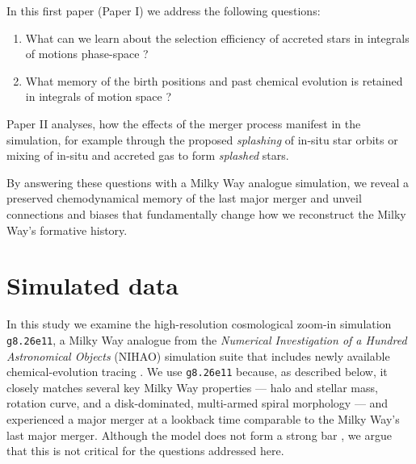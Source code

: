 \documentclass[fleqn,usenatbib]{mnras}
\begin{document}
In this first paper (Paper I) we address the following questions: 
\begin{enumerate}[leftmargin=2em,labelwidth=0em]
    \item What can we learn about the selection efficiency of accreted stars in integrals of motions phase-space \citep{Helmi2018, Feuillet2021, Buder2022, Monty2024}?
    \item What memory of the birth positions and past chemical evolution is retained in integrals of motion space \citep{Skuladottir2025}?
\end{enumerate}

Paper II analyses, how the effects of the merger process manifest in the simulation, for example through the proposed \textit{splashing} of in-situ star orbits \citep{Belokurov2020} or mixing of in-situ and accreted gas to form \textit{splashed} stars.

By answering these questions with a Milky Way analogue simulation, we reveal a preserved chemodynamical memory of the last major merger and unveil connections and biases that fundamentally change how we reconstruct the Milky Way's formative history.

\section{Simulated data} \label{sec:data}

In this study we examine the high-resolution cosmological zoom-in simulation \texttt{g8.26e11}, a Milky Way analogue from the \textit{Numerical Investigation of a Hundred Astronomical Objects} (NIHAO) simulation suite \citep{Wang2015} that includes newly available chemical-evolution tracing \citep{Buck2021}.
We use \texttt{g8.26e11} because, as described below, it closely matches several key Milky Way properties — halo and stellar mass, rotation curve, and a disk-dominated, multi-armed spiral morphology — and experienced a major merger at a lookback time comparable to the Milky Way's last major merger.
Although the model does not form a strong bar \citep[see][]{Buder2025}, we argue that this is not critical for the questions addressed here.
\end{document}
